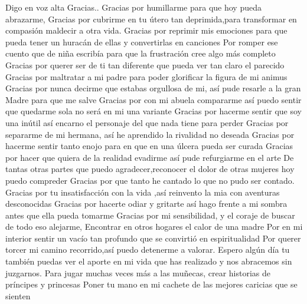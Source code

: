 \documentclass[12pt, a4paper, twoside]{book} %
\begin{document}
Digo en voz alta Gracias..
Gracias por humillarme para que hoy pueda abrazarme,
Gracias por cubrirme en tu útero tan deprimida,para transformar en compasión maldecir a otra vida.
Gracias por reprimir mis emociones para que pueda tener un huracán de ellas y convertirlas en canciones
Por romper ese cuento que de niña escribía para que la frustración cree algo más completo
Gracias por querer ser de ti tan diferente que pueda ver tan claro el parecido
Gracias por maltratar a mi padre para poder glorificar la figura de mi animus
Gracias por nunca decirme que estabas orgullosa de mi, así pude resarle a la gran Madre para que me salve
Gracias por con mi abuela compararme así puedo sentir que quedarme sola no será en mi una variante
Gracias por hacerme sentir que soy una inútil así encarno el personaje del que nada tiene para perder
Gracias por separarme de mi hermana, así he aprendido la rivalidad no deseada
Gracias por hacerme sentir tanto enojo para en que en una úlcera pueda ser curada
Gracias por hacer que quiera de la realidad evadirme  así pude refurgiarme en el arte
De tantas otras partes que puedo agradecer,reconocer el dolor de otras mujeres hoy puedo compreder
Gracias por que tanto he cantado lo que no pudo ser contado.
Gracias por tu insatisfacción con la vida ,así reinvento la mia con aventuras desconocidas
Gracias por hacerte odiar y gritarte así hago frente a mi sombra antes que ella pueda tomarme
Gracias  por mi sensibilidad, y el coraje de buscar de todo eso alejarme,
Encontrar en otros hogares el calor de una madre
Por en mi interior  sentir un vacío tan profundo que  se convirtió en espiritualidad
Por querer torcer mi camino recorrido,así puedo detenerme a valorar.
Espero algún día tu también puedas ver el aporte en mi vida que has realizado y nos abracemos sin juzgarnos.
Para jugar muchas veces más a las muñecas, crear historias de príncipes y princesas
Poner tu mano en mi cachete de las mejores caricias que se sienten
\end{document}
